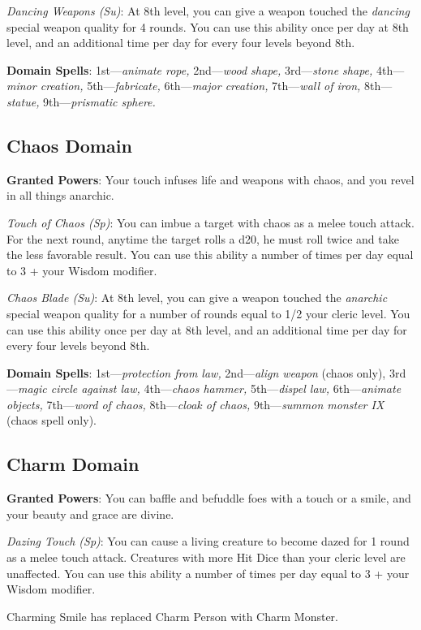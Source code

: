 \textit{Dancing Weapons (Su)}: At 8th level, you can give a weapon touched the \textit{dancing }special weapon quality for 4 rounds. You can use this ability once per day at 8th level, and an additional time per day for every four levels beyond 8th.
				
\textbf{Domain Spells}: 1st---\textit{animate rope, }2nd---\textit{wood shape, }3rd---\textit{stone shape, }4th---\textit{minor creation, }5th---\textit{fabricate, }6th---\textit{major creation, }7th---\textit{wall of iron, }8th---\textit{statue, }9th---\textit{prismatic sphere.}
				
\subsection{Chaos Domain}

				
\textbf{Granted Powers}: Your touch infuses life and weapons with chaos, and you revel in all things anarchic.

\textit{Touch of Chaos (Sp)}: You can imbue a target with chaos as a melee touch attack. For the next round,
    anytime the target rolls a d20, he must roll twice and take the less favorable result. You can use this 
    ability a number of times per day equal to 3 + your Wisdom modifier.
				
\textit{Chaos Blade (Su)}: At 8th level, you can give a weapon touched the\textit{ anarchic }special weapon
    quality for a number of rounds equal to 1/2 your cleric level. You can use this ability once per day at
    8th level, and an additional time per day for every four levels beyond 8th.
				
\textbf{Domain Spells}: 1st---\textit{protection from law, }2nd---\textit{align weapon }(chaos only), 3rd---\textit{magic circle against law, }4th---\textit{chaos hammer, }5th---\textit{dispel law, }6th---\textit{animate objects, }7th---\textit{word of chaos, }8th---\textit{cloak of chaos, }9th---\textit{summon monster IX} (chaos spell only).
				
\subsection{Charm Domain}

				
\textbf{Granted Powers}: You can baffle and befuddle foes with a touch or a smile, and your beauty and grace 
    are divine.

\textit{Dazing Touch (Sp)}: You can cause a living creature to become dazed for 1 round as a melee touch attack.
    Creatures with more Hit Dice than your cleric level are unaffected. You can use this ability a number of 
    times per day equal to 3 + your Wisdom modifier.
\begin{formal}
 Charming Smile has replaced Charm Person with Charm Monster.
\end{formal}

